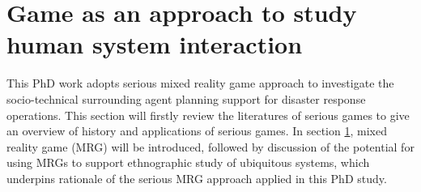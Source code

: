\section{Game as an approach to study human system interaction } \label{sec:LRMRgame}
This PhD work adopts serious mixed reality game approach to investigate the socio-technical surrounding agent planning support for disaster response operations. This section will firstly review the literatures of serious games to give an overview of history and applications of serious games. In section \ref{sec:LRMRgame}, mixed reality game (MRG) will be introduced, followed by discussion of the potential for using MRGs to support ethnographic study of ubiquitous systems, which underpins rationale of the serious MRG approach applied in this PhD study.\\ 



